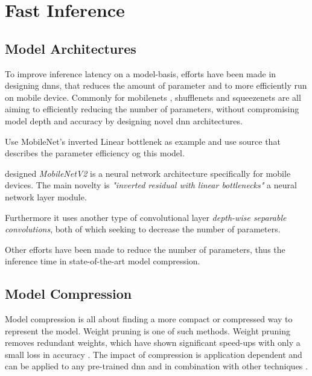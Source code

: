 \section{Fast Inference} \label{sec:ei-fast-inference}


\subsection{Model Architectures}

To improve inference latency on a model-basis, efforts have been made in designing \gls{dnn}s, that reduces the amount of parameter and to more efficiently run on mobile device. Commonly for \gls{mobilenet}s \cite{howard_mobilenets:_2017,sandler_mobilenetv2:_2018}, \gls{shufflenet}s \cite{zhang_shufflenet:_2017, ma_shufflenet_2018} and \gls{squeezenet}s \cite{iandola_squeezenet:_2016} are all aiming to efficiently reducing the number of parameters, without compromising model depth and accuracy by designing novel \gls{dnn} architectures.

Use MobileNet's inverted Linear bottlenek as example and use source that describes the parameter efficiency og this model. 

\citeauthor{sandler_mobilenetv2:_2018} designed \textsl{MobileNetV2} is a neural network architecture specifically for mobile devices. The main novelty is \textit{"inverted residual with linear bottlenecks"} a neural network layer module. 

Furthermore it uses another type of convolutional layer \textit{depth-wise separable convolutions}, both of which seeking to decrease the number of parameters. 

Other efforts have been made to reduce the number of parameters, thus the inference time in state-of-the-art model compression. 

\subsection{Model Compression}

Model compression is all about finding a more compact or compressed way to represent the model. Weight pruning is one of such methods. Weight pruning removes redundant weights, which have shown significant speed-ups with only a small loss in accuracy \cite{zhou_edge_2019}. The impact of compression is application dependent and can be applied to any pre-trained \gls{dnn} and in combination with other techniques \cite{cheng_survey_2017}.

